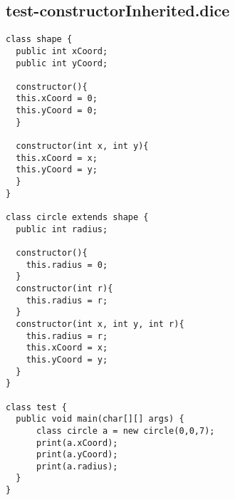 \subsection{test-constructorInherited.dice}
\begin{verbatim}
class shape {
  public int xCoord;
  public int yCoord;

  constructor(){
  this.xCoord = 0;
  this.yCoord = 0;
  }

  constructor(int x, int y){
  this.xCoord = x;
  this.yCoord = y;
  }
}

class circle extends shape {
  public int radius;

  constructor(){
  	this.radius = 0;
  }
  constructor(int r){
  	this.radius = r;
  }
  constructor(int x, int y, int r){
  	this.radius = r;
  	this.xCoord = x;
  	this.yCoord = y;
  }
}

class test {
  public void main(char[][] args) {
      class circle a = new circle(0,0,7); 
      print(a.xCoord);
      print(a.yCoord);
      print(a.radius);
  }
}
\end{verbatim}
